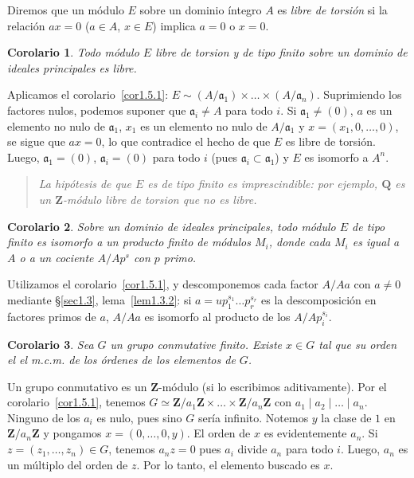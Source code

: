 \documentclass[bibtotoc,leqno,spanish]{amsbook}
\newcommand{\QQ}{\mathbf{Q}}
\newcommand{\ZZ}{\mathbf{Z}}
\newcommand{\idl}[1]{\mathfrak{#1}}
\numberwithin{equation}{section}
\newenvironment{comm}%
	{\begin{quotation}\itshape}
	{\end{quotation}}
\theoremstyle{note}
\theoremstyle{note}
\newtheorem{corollary}{Corolario}
\theoremstyle{rem}
\numberwithin{theorem}{section}
\numberwithin{proposition}{section}
\numberwithin{definition}{section}
\numberwithin{lemma}{section}
\numberwithin{corollary}{section}
\numberwithin{example}{section}
\numberwithin{footnote}{section}%
\begin{document}
Diremos que un m\'odulo $E$ sobre un dominio \'integro $A$ es
{\em libre de torsi\'on} si la relaci\'on $ax = 0$
($a\in A$, $x\in E$) implica $a = 0$ o $x = 0$.

\begin{corollary}
Todo m\'odulo $E$ libre de torsion y de tipo finito
sobre un dominio de ideales principales es libre.
\end{corollary}

Aplicamos el corolario~\ref{cor1.5.1}: $E \sim (A/\idl{a}_{1})\times\dots
\times (A/\idl{a}_{n})$. Suprimiendo los factores nulos, podemos
suponer que $\idl{a}_{i}\neq A$ para todo $i$. Si $\idl{a}_{1}\neq(0)$,
$a$ es un elemento no nulo de $\idl{a}_{1}$,
$x_{1}$ es un elemento no nulo de $A/\idl{a}_{1}$ y
$x = (x_{1},0,\dots,0)$, se sigue que $ax = 0$, lo que contradice
el hecho de que $E$ es libre de torsi\'on. Luego,
$\idl{a}_{1} = (0)$, $\idl{a}_{i} = (0)$ para todo $i$ (pues
$\idl{a}_{i}\subset\idl{a}_{1}$) y $E$ es isomorfo a $A^{n}$.

\begin{comm}
La hip\'otesis de que $E$ es de tipo finito es imprescindible:
por ejemplo, $\QQ$ es un $\ZZ$-m\'odulo libre de torsion que no
es libre.
\end{comm}

\begin{corollary}
Sobre un dominio de ideales principales, todo m\'odulo $E$
de tipo finito es isomorfo a un producto finito de m\'odulos
$M_{i}$, donde cada $M_{i}$ es igual a $A$ o a un cociente
$A/Ap^{s}$ con $p$ primo.
\end{corollary}

Utilizamos el corolario~\ref{cor1.5.1}, y descomponemos cada factor
$A/Aa$ con $a\neq 0$ mediante \S\ref{sec1.3}, lema~\ref{lem1.3.2}: si
$a = up_{1}^{s_{1}}\dots p_{r}^{s_{r}}$ es la
descomposici\'on en factores primos de $a$, $A/Aa$ es
isomorfo al producto de los $A/Ap_{i}^{s_{i}}$.

\begin{corollary}\label{cor1.5.4}
Sea $G$ un grupo conmutative finito. Existe $x\in G$ tal que
su orden el el m.c.m. de los \'ordenes de los elementos de $G$.
\end{corollary}

Un grupo conmutativo es un $\ZZ$-m\'odulo (si lo escribimos
aditivamente). Por el corolario~\ref{cor1.5.1}, tenemos $G \simeq
\ZZ/a_{1}\ZZ\times\dots\times\ZZ/a_{n}\ZZ$ con
$a_{1}\mid a_{2}\mid\dots\mid a_{n}$. Ninguno de los $a_{i}$
es nulo, pues sino $G$ ser\'ia infinito. Notemos $y$ la
clase de $1$ en $\ZZ/a_{n}\ZZ$ y pongamos $x = (0,\dots,0,y)$.
El orden de $x$ es evidentemente $a_{n}$. Si $z = (z_{1},\dots,z_{n})\in G$,
tenemos $a_{n}z = 0$ pues $a_{i}$ divide $a_{n}$ para todo $i$.
Luego, $a_{n}$ es un m\'ultiplo del orden de $z$. Por lo tanto, el
elemento buscado es $x$.
\end{document}
